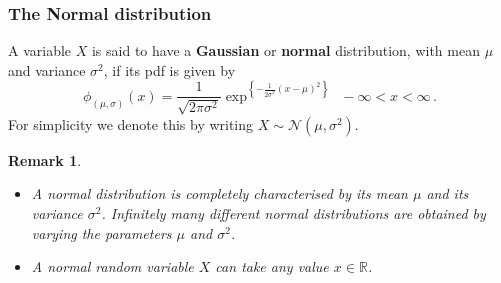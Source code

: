 \documentclass[notes=show,smaller,handout]{beamer}
\newtheorem{remark}{Remark}[section]
\newcommand{\N}{\mathcal{N}}
\newenvironment{stepitemize}{\begin{itemize}[<+->]}{\end{itemize} }
\begin{document}





\begin{frame}%

\frametitle{The Normal distribution}

\begin{definition}
A variable $X$ is said to have a \textbf{Gaussian} or \textbf{normal}
distribution, with mean $\mu $ and variance $\sigma ^{2}$, if its pdf is given by
\begin{equation*}
\phi_{(\mu,\sigma)}(x) =\frac{1}{\sqrt{2\pi \sigma ^{2}}}\exp^{ \left\{ -\frac{1%
}{2\sigma ^{2}}\left( x-\mu \right) ^{2}\right\}}~~-\infty<x<\infty\,.
\end{equation*}
For simplicity we denote this by writing $X\sim \N\left( \mu ,\sigma ^{2}\right) $. 
\end{definition}

\begin{remark}
\begin{stepitemize}
\item A normal distribution is completely characterised by its mean $\mu $ and its variance $\sigma ^{2}$. Infinitely many different normal distributions are obtained by varying the parameters $\mu $ and $\sigma ^{2}$.
\item A normal random variable $X$ can take any value $x\in\mathbb{R}$.
\end{stepitemize}
\end{remark}

\end{frame}%
\end{document}
